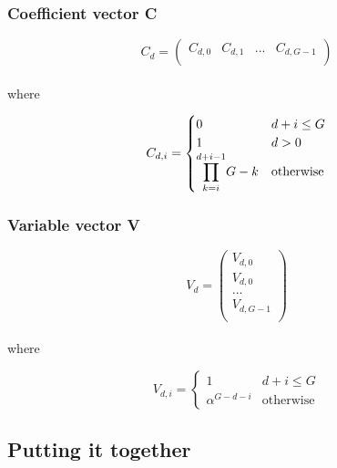 \subsubsection{Coefficient vector C}

\begin{equation*}
    C_{d}=
    \left(
    \begin{array}{cccc}
            C_{d,0} & C_{d,1} & ... & C_{d,G - 1} \\
        \end{array}
    \right)
\end{equation*}
\\
where

\begin{equation*}
    C_{d,i}=
    \begin{cases}
        0                                            & d + i \leq G     \\
        1                                            & d>0              \\
        \mathlarger{\prod}_{k = i}^{d + i - 1} G - k & \text{otherwise}
    \end{cases}
\end{equation*}

\subsubsection{Variable vector V}

\begin{equation*}
    V_{d}=
    \left(
    \begin{array}{cccc}
            V_{d,0}   \\
            V_{d,0}   \\
            ...       \\
            V_{d,G-1} \\
        \end{array}
    \right)
\end{equation*}
\\
where

\begin{equation*}
    V_{d,i}=\begin{cases}
        1                  & d + i \leq G     \\
        \alpha^{G - d - i} & \text{otherwise}
    \end{cases}
\end{equation*}

\subsection{Putting it together}

